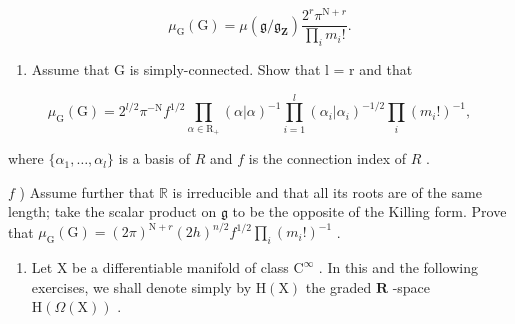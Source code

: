 \begin{enumerate}
\[
\mu_ {\mathrm{G}} (\mathrm{G}) = \mu (\mathfrak {g} / \mathfrak {g} _ {\mathbf {Z}}) \frac {2 ^ {r} \pi^ {\mathrm{N} + r}}{\prod_ {i} m _ {i} !}.
\]

\begin{enumerate}
\def\labelenumi{\alph{enumi})}
\setcounter{enumi}{4}
\tightlist
\item
  Assume that G is simply-connected. Show that l = r and that
\end{enumerate}

\[
\mu_ {\mathrm{G}} (\mathrm{G}) = 2 ^ {l / 2} \pi^ {- \mathrm{N}} f ^ {1 / 2} \prod_ {\alpha \in \mathrm{R} _ {+}} (\alpha | \alpha) ^ {- 1} \prod_ {i = 1} ^ {l} (\alpha_ {i} | \alpha_ {i}) ^ {- 1 / 2} \prod_ {i} (m _ {i}!) ^ {- 1},
\]

where \(\{\alpha_1, \ldots, \alpha_l\}\) is a basis of \(R\) and \(f\) is the connection index of \(R\) .

\(f\) ) Assume further that \(\mathbb{R}\) is irreducible and that all its roots are of the same length; take the scalar product on \(\mathfrak{g}\) to be the opposite of the Killing form. Prove that \(\mu_{\mathrm{G}}(\mathrm{G}) = (2\pi)^{\mathrm{N} + r}(2h)^{n / 2}f^{1 / 2}\prod_{i}(m_i!)^{-1}\) .

\begin{enumerate}
\def\labelenumi{\arabic{enumi})}
\setcounter{enumi}{3}
\tightlist
\item
  Let \(\mathrm{X}\) be a differentiable manifold of class \(\mathrm{C}^{\infty}\) . In this and the following exercises, we shall denote simply by \(\mathrm{H}(\mathrm{X})\) the graded \(\mathbf{R}\) -space \(\mathrm{H}(\Omega (\mathrm{X}))\) .
\end{enumerate}


\end{enumerate}
